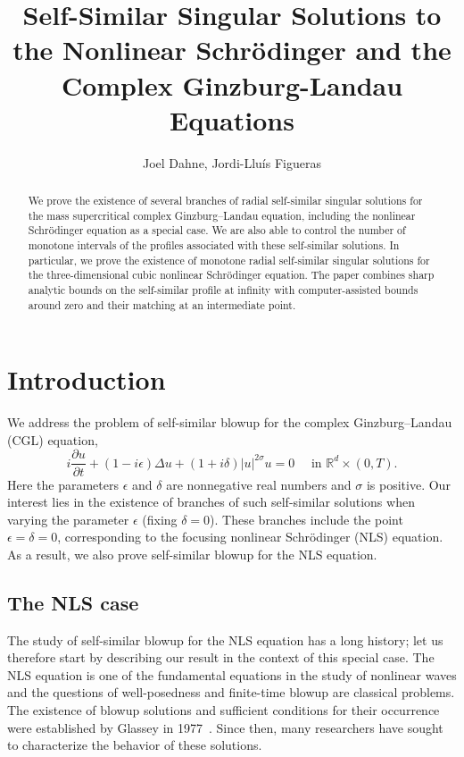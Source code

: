 \documentclass[11pt]{article}
\title{Self-Similar Singular Solutions to the Nonlinear Schrödinger and the Complex Ginzburg-Landau Equations}
\author{Joel Dahne, Jordi-Llu\'is Figueras}
\date{}
\begin{document}
\maketitle

\begin{abstract}
  We prove the existence of several branches of radial self-similar
  singular solutions for the mass supercritical complex
  Ginzburg--Landau equation, including the nonlinear Schrödinger
  equation as a special case. We are also able to control the number
  of monotone intervals of the profiles associated with these
  self-similar solutions. In particular, we prove the existence of
  monotone radial self-similar singular solutions for the
  three-dimensional cubic nonlinear Schrödinger equation. The paper
  combines sharp analytic bounds on the self-similar profile at
  infinity with computer-assisted bounds around zero and their
  matching at an intermediate point.
\end{abstract}

\tableofcontents

\section{Introduction}
\label{sec:introduction}
We address the problem of self-similar blowup for the complex
Ginzburg--Landau (CGL) equation,
\begin{equation}
  \label{eq:CGL}
  i \frac{\partial u}{\partial t} + (1 - i\epsilon)\Delta u + (1 + i\delta)|u|^{2\sigma}u = 0
  \quad \text{ in }\mathbb{R}^{d} \times (0, T).
\end{equation}
Here the parameters \(\epsilon\) and \(\delta\) are nonnegative real
numbers and \(\sigma\) is positive. Our interest lies in the existence
of branches of such self-similar solutions when varying the parameter
\(\epsilon\) (fixing \(\delta = 0\)). These branches include the point
\(\epsilon = \delta = 0\), corresponding to the focusing nonlinear
Schrödinger (NLS) equation. As a result, we also prove self-similar
blowup for the NLS equation.

\subsection{The NLS case}
\label{sec:nls-case}
The study of self-similar blowup for the NLS equation has a long
history; let us therefore start by describing our result in the
context of this special case. The NLS equation is one of the
fundamental equations in the study of nonlinear waves and the
questions of well-posedness and finite-time blowup are classical
problems. The existence of blowup solutions and sufficient conditions
for their occurrence were established by Glassey in
1977~\cite{Glassey77}. Since then, many researchers have sought to
characterize the behavior of these solutions.
\end{document}
